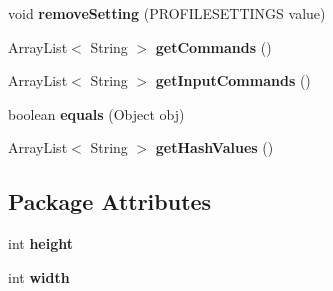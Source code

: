 \begin{DoxyCompactItemize}
\item 
\hypertarget{classvideo_1_1_video_profile_a24539e1cdfce5b4444708cce47695f5d}{
void {\bfseries removeSetting} (PROFILESETTINGS value)}
\label{classvideo_1_1_video_profile_a24539e1cdfce5b4444708cce47695f5d}

\item 
\hypertarget{classvideo_1_1_video_profile_aaa394240d8b71b32ef180bbefe6e8552}{
ArrayList$<$ String $>$ {\bfseries getCommands} ()}
\label{classvideo_1_1_video_profile_aaa394240d8b71b32ef180bbefe6e8552}

\item 
\hypertarget{classvideo_1_1_video_profile_ae032730f51a6a1121589539511fb2c07}{
ArrayList$<$ String $>$ {\bfseries getInputCommands} ()}
\label{classvideo_1_1_video_profile_ae032730f51a6a1121589539511fb2c07}

\item 
\hypertarget{classvideo_1_1_video_profile_a750f39d45c3ca8af3fb9341bfea3c8c5}{
boolean {\bfseries equals} (Object obj)}
\label{classvideo_1_1_video_profile_a750f39d45c3ca8af3fb9341bfea3c8c5}

\item 
\hypertarget{classvideo_1_1_video_profile_af67afe451da07cfc619564e0dc36bd06}{
ArrayList$<$ String $>$ {\bfseries getHashValues} ()}
\label{classvideo_1_1_video_profile_af67afe451da07cfc619564e0dc36bd06}

\end{DoxyCompactItemize}
\subsection*{Package Attributes}
\begin{DoxyCompactItemize}
\item 
\hypertarget{classvideo_1_1_video_profile_a2632b6ca98196ddef1048150828df1a6}{
int {\bfseries height}}
\label{classvideo_1_1_video_profile_a2632b6ca98196ddef1048150828df1a6}

\item 
\hypertarget{classvideo_1_1_video_profile_af5cdeb2dd7f2febe6f3eb4b58788257a}{
int {\bfseries width}}
\label{classvideo_1_1_video_profile_af5cdeb2dd7f2febe6f3eb4b58788257a}

\end{DoxyCompactItemize}


